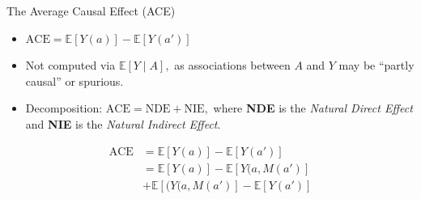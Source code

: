 \documentclass[12pt,t]{beamer}
\newcommand{\E}{\mathbb{E}}
\begin{document}

\begin{frame}[c]{The Average Causal Effect (ACE)}

\begin{center}
\begin{itemize}
  \itemsep10pt
  \item $\text{ACE} = \E[Y(a)] - \E[Y(a')]$
  \item Not computed via $\E[Y \mid A],$ as associations between $A$ and $Y$ may
    be ``partly causal'' or spurious.
  \item Decomposition: $\text{ACE} = \text{NDE} + \text{NIE},$ where
    \textbf{NDE} is the \textit{Natural Direct Effect} and \textbf{NIE} is the
    \textit{Natural Indirect Effect}.
\end{itemize}
\begin{equation*}
\begin{split}
  \text{ACE} & = \E[Y(a)] - \E[Y(a')] \\ & = \E[Y(a)] - \E[Y(a, M(a')] \\ & +
    \E[(Y(a, M(a')] - \E[Y(a')]
\end{split}
\end{equation*}
\end{center}


\end{frame}

\end{document}
